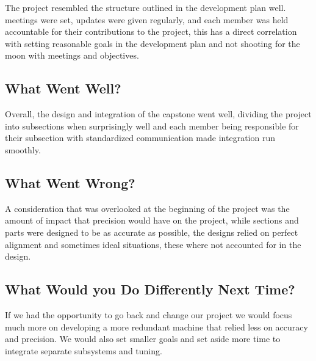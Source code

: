 \documentclass{article}
\begin{document}

The project resembled the structure outlined in the development plan well. meetings were set, updates were given regularly, and each member was held accountable for their contributions to the project, this has a direct correlation with setting reasonable goals in the development plan and not shooting for the moon with meetings and objectives.

\subsection{What Went Well?}


Overall, the design and integration of the capstone went well, dividing the project into subsections when surprisingly well and each member being responsible for their subsection with standardized communication made integration run smoothly.

\subsection{What Went Wrong?}


A consideration that was overlooked at the beginning of the project was the amount of impact that precision would have on the project, while sections and parts were designed to be as accurate as possible, the designs relied on perfect alignment and sometimes ideal situations, these where not accounted for in the design.

\subsection{What Would you Do Differently Next Time?}


If we had the opportunity to go back and change our project we would focus much more on developing a more redundant machine that relied less on accuracy and precision. We would also set smaller goals and set aside more time to integrate separate subsystems and tuning.
\end{document}

